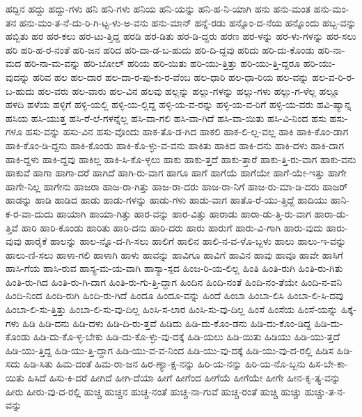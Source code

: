 {ಹದ್ದಿನ
ಹದ್ದು
ಹದ್ದು-ಗಳು
ಹನಿ
ಹನಿ-ಗಳು
ಹನಿಯ
ಹನಿ-ಯನ್ನು
ಹನಿ-ಹ-ನಿ-ಯಾಗಿ
ಹನು
ಹನು-ಮಂತ
ಹನು-ಮಂ-ತನ
ಹನು-ಮಂ-ತ-ನೆ-ದು-ರಿ-ಗಿ-ಟ್ಟ-ಳು-ಅ-ವನು
ಹನು-ಮಾನ್
ಹನ್ನೆ-ರಡು
ಹನ್ನೊಂ-ದ-ನೆಯ
ಹನ್ನೊಂದು
ಹಬ್ಬ-ವನ್ನು
ಹಬ್ಬಿತು
ಹರ
ಹರ-ಕಲು
ಹರ-ಟು-ತ್ತಿದ್ದ
ಹರಡಿ
ಹರ-ಡಿತು
ಹರ-ಡಿ-ದ್ದರು
ಹರಣ
ಹರ-ಳನ್ನು
ಹರ-ಳು-ಗಳನ್ನು
ಹರ-ಸಲು
ಹರಿ
ಹರಿ-ಹ-ರ-ನಂತೆ
ಹರಿ-ಜನ
ಹರಿದ
ಹರಿ-ದಾ-ಡ-ಬ-ಹುದು
ಹರಿ-ದಿ-ದ್ದವು
ಹರಿದು
ಹರಿ-ದು-ಕೊಂಡು
ಹರಿ-ನಾ-ಮದ
ಹರಿ-ನಾ-ಮ-ವನ್ನು
ಹರಿ-ಬೋಲ್
ಹರಿಯ
ಹರಿ-ಯಿತು
ಹರಿ-ಯು-ತ್ತಿತ್ತು
ಹರಿ-ಯು-ತ್ತಿ-ದ್ದರೂ
ಹರಿ-ಯು-ವುದನ್ನು
ಹರಿವ
ಹಲ
ಹಲ-ದಾರ
ಹಲ-ದಾ-ರ-ಪು-ಕು-ರ-ವೆಂಬ
ಹಲ-ಧಾರಿ
ಹಲ-ಧಾ-ರಿಯ
ಹಲ-ವನ್ನು
ಹಲ-ವ-ರಿ-ರ-ಬ-ಹುದು
ಹಲ-ವರು
ಹಲ-ವಾರು
ಹಲ-ವಿನ
ಹಲವು
ಹಲ್ಲನ್ನು
ಹಲ್ಲು-ಗಳನ್ನು
ಹಲ್ಲು-ಗಳು
ಹಲ್ಲು-ಗ-ಳೆಲ್ಲ
ಹಲ್ಲೂ
ಹಳದಿ
ಹಳೆಯ
ಹಳ್ಳಿಗೆ
ಹಳ್ಳಿ-ಯಲ್ಲಿ
ಹಳ್ಳಿ-ಯ-ಲ್ಲಿದ್ದ
ಹಳ್ಳಿ-ಯ-ವ-ರನ್ನು
ಹಳ್ಳಿ-ಯ-ವ-ರಿಗೆ
ಹಳ್ಳಿ-ಯ-ವರು
ಹವಿ-ಷ್ಯಾನ್ನ
ಹಸಿಯ
ಹಸಿ-ಯುತ್ತ
ಹಸಿ-ರೆ-ಲೆ-ಗಳನ್ನೆಲ್ಲ
ಹಸಿ-ವಾ-ಗಲಿ
ಹಸಿ-ವಾ-ಗಿದೆ
ಹಸಿ-ವಾ-ಯಿತು
ಹಸಿ-ವಿ-ನಿಂದ
ಹಸು
ಹಸು-ಗಳೂ
ಹಸು-ವನ್ನು
ಹಸು-ವಿನ
ಹಸು-ವೊಂದು
ಹಾಕ-ತೊ-ಡ-ಗಿದ
ಹಾಕಲಿ
ಹಾಕ-ಲಿ-ಲ್ಲ-ವಲ್ಲ
ಹಾಕಿ
ಹಾಕಿ-ಕೊಂ-ಡಾಗ
ಹಾಕಿ-ಕೊಂ-ಡಿ-ದ್ದನು
ಹಾಕಿ-ಕೊಂಡು
ಹಾಕಿ-ಕೊ-ಳ್ಳು-ವ-ವನು
ಹಾಕಿತು
ಹಾಕಿದ
ಹಾಕಿ-ದನು
ಹಾಕಿ-ದಳು
ಹಾಕಿ-ದಾಗ
ಹಾಕಿ-ದ್ದಳು
ಹಾಕಿ-ದ್ದವು
ಹಾಕಿಲ್ಲ
ಹಾಕಿ-ಸಿ-ಕೊ-ಳ್ಳಲು
ಹಾಕು
ಹಾಕು-ತ್ತದೆ
ಹಾಕು-ತ್ತಾರೆ
ಹಾಕು-ತ್ತಿ-ರು-ವಾಗ
ಹಾಕು-ವನು
ಹಾಕುವೆ
ಹಾಗಾ
ಹಾಗಾ-ದರೆ
ಹಾಗಿದೆ
ಹಾಗಿ-ರು-ವಾಗ
ಹಾಗೂ
ಹಾಗೆ
ಹಾಗೆಯೆ
ಹಾಗೆಯೇ
ಹಾಗೆ-ಯೇ-ಇತ್ತು
ಹಾಗೇ
ಹಾಗೇ-ನಿಲ್ಲ
ಹಾಗೇನು
ಹಾಜರಾ
ಹಾಜ-ರಾ-ಗಿತ್ತು
ಹಾಜ-ರಾ-ದರು
ಹಾಜ-ರಾ-ನಿಗೆ
ಹಾಜ-ರು-ಮಾ-ಡಿ-ದರು
ಹಾಜರ್
ಹಾಡನ್ನು
ಹಾಡಿ
ಹಾಡಿದ
ಹಾಡು
ಹಾಡು-ಗಳನ್ನು
ಹಾಡು-ಗಳು
ಹಾಡು-ವಾಗ
ಹಾತೊ-ರೆ-ಯು-ತ್ತಿದ್ದೆ
ಹಾದಿಯು
ಹಾನಿ-ಕ-ರ-ವಾ-ದುದು
ಹಾಯಾಗಿ
ಹಾಯಾ-ಗಿತ್ತು
ಹಾರ-ವನ್ನು
ಹಾರ-ವಿತ್ತು
ಹಾರಾಡು
ಹಾರಾ-ಡು-ತ್ತಿ-ರು-ವಾಗ
ಹಾರಾ-ಡು-ತ್ತಿವೆ
ಹಾರಿ
ಹಾರಿ-ಕೊಂಡು
ಹಾರಿತು
ಹಾರಿ-ದನು
ಹಾರಿ-ದರು
ಹಾರು
ಹಾರುಗೆ
ಹಾರು-ವಿ-ಗಾಗಿ
ಹಾರು-ವುದು
ಹಾರು-ವುವು
ಹಾರೈಕೆ
ಹಾಲನ್ನು
ಹಾಲ-ನ್ನೊ-ದ-ಗಿ-ಸಲು
ಹಾಲಿಗೆ
ಹಾಲಿನ
ಹಾಲಿ-ನ-ವ-ಳೊ-ಬ್ಬಳು
ಹಾಲು
ಹಾಲು-ಇ-ವನ್ನು
ಹಾಲು-ಣಿ-ಸಲು
ಹಾಳಾ-ಗಲಿ
ಹಾಳಾಗಿ
ಹಾಳು
ಹಾವನ್ನು
ಹಾವಿಗೂ
ಹಾವಿಗೆ
ಹಾವಿನ
ಹಾವು
ಹಾವೂ
ಹಾವೇ
ಹಾಸಿಗೆ
ಹಾಸಿ-ಗೆಯ
ಹಾಸಿ-ರುವ
ಹಾಸ್ಯ-ಮ-ಯ-ವಾಗಿ
ಹಾಸ್ಯಾ-ಸ್ಪದ
ಹಿಂಜ-ರಿ-ಯ-ಲಿಲ್ಲ
ಹಿಂತಿ
ಹಿಂತಿ-ರುಗಿ
ಹಿಂತಿ-ರು-ಗಿತು
ಹಿಂತಿ-ರು-ಗಿದ
ಹಿಂತಿ-ರು-ಗಿ-ದಾಗ
ಹಿಂತಿ-ರು-ಗು-ತ್ತಿ-ದ್ದಾಗ
ಹಿಂದಿನ
ಹಿಂದಿ-ನಂತೆ
ಹಿಂದಿ-ನಂ-ತೆಯೇ
ಹಿಂದಿ-ನ-ವನಿ
ಹಿಂದಿ-ನಿಂದ
ಹಿಂದಿ-ರುಗಿ
ಹಿಂದಿ-ರು-ಗಿದೆ
ಹಿಂದೂ
ಹಿಂದೂ-ವನ್ನು
ಹಿಂದೆ
ಹಿಂಬಾ
ಹಿಂಬಾ-ಲಿಸಿ
ಹಿಂಬಾ-ಲಿ-ಸಿ-ದವು
ಹಿಂಬಾ-ಲಿ-ಸು-ತ್ತಿತ್ತು
ಹಿಂಬಾ-ಲಿ-ಸು-ವು-ದಿಲ್ಲ
ಹಿಂಸಿ-ಸ-ಲಾರ
ಹಿಂಸಿ-ಸು-ವು-ದಿಲ್ಲ
ಹಿಂಸೆ
ಹಿಂಸೆಯ
ಹಿಂಸೆ-ಯನ್ನು
ಹಿಕ್ಕೆ-ಗಳು
ಹಿಡಿ
ಹಿಡಿ-ದನು
ಹಿಡಿ-ದಳು
ಹಿಡಿ-ದಿ-ರು-ತ್ತವೆ
ಹಿಡಿದು
ಹಿಡಿ-ದು-ಕೊಂ-ಡನು
ಹಿಡಿ-ದು-ಕೊಂ-ಡಿದ್ದ
ಹಿಡಿ-ದು-ಕೊಂಡು
ಹಿಡಿ-ದು-ಕೊ-ಳ್ಳ-ಬೇಕು
ಹಿಡಿ-ದು-ಕೊ-ಳ್ಳು-ವು-ದಕ್ಕೆ
ಹಿಡಿ-ಯಲು
ಹಿಡಿ-ಯಿತು
ಹಿಡಿಯು
ಹಿಡಿ-ಯು-ತ್ತದೆ
ಹಿಡಿ-ಯು-ತ್ತಿದ್ದ
ಹಿಡಿ-ಯು-ತ್ತಿ-ದ್ದಾಗ
ಹಿಡಿ-ಯು-ವ-ವ-ನಿಂದ
ಹಿಡಿ-ಯು-ವು-ದಕ್ಕೆ
ಹಿಡಿ-ಯು-ವು-ದ-ರಲ್ಲಿ
ಹಿಡಿಸ
ಹಿಡಿ-ಸದು
ಹಿಡಿ-ಸಿತು
ಹಿಮ-ದಂತೆ
ಹಿಮ-ರಾ-ಜನ
ಹಿರ-ಣ್ಯಾ-ಕ್ಷ-ನನ್ನು
ಹಿರಿ-ಯ-ನನ್ನು
ಹಿರಿ-ಯ-ನೊ-ಬ್ಬನು
ಹಿಸ-ಬೇ-ಕಾ-ಯಿತು
ಹಿಸಿದೆ
ಹಿಸು-ಕಿ-ದರೆ
ಹೀಗಿದೆ
ಹೀಗಿ-ದೆಯಾ
ಹೀಗೆ
ಹೀಗೆಂದ
ಹೀಗೆಯೆ
ಹೀಗೆಯೇ
ಹೀಗೇ
ಹೀನ-ಕೃ-ತ್ಯ-ವನ್ನು
ಹೀರು
ಹೀರು-ವು-ದ-ರಲ್ಲಿ
ಹುಚ್ಚ
ಹುಚ್ಚನ
ಹುಚ್ಚ-ನಂತೆ
ಹುಚ್ಚ-ನಾ-ಗುವೆ
ಹುಚ್ಚ-ರಂತೆ
ಹುಚ್ಚಿ
ಹುಚ್ಚು
ಹುಚ್ಚು-ತ-ನ-ವನ್ನು
}
